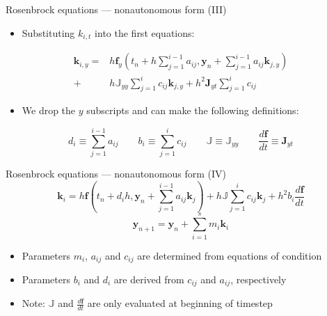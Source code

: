 \documentclass[serif]{beamer}
\begin{document}
\begin{frame}{Rosenbrock equations --- nonautonomous form (III)}
  \label{slide:nonautonomous}
  \begin{itemize}
  \item<1-> Substituting $k_{i,t}$ into the first equations:
  \end{itemize}
  \begin{align*}
    \mathbf{k}_{i,y} = &  h\mathbf{f}_y \left(t_n + h\sum_{j=1}^{i-1}a_{ij},\mathbf{y}_n + \sum_{j=1}^{i-1}a_{ij}\mathbf{k}_{j,y}\right) \\
                                + & h\mathbb{J}_{yy}\sum_{j=1}^i c_{ij}\mathbf{k}_{j,y}  + h^2\mathbf{J}_{yt}\sum_{j=1}^i c_{ij}
  \end{align*}
  \begin{itemize}
  \item We drop the $y$ subscripts and can make the following definitions: 
  \end{itemize}
  \begin{equation}
    \nonumber d_i \equiv \sum_{j=1}^{i-1} a_{ij} \qquad  b_i \equiv \sum_{j=1}^i c_{ij} \qquad \mathbb{J} \equiv \mathbb{J}_{yy} \qquad \frac{d\mathbf{f}}{dt} \equiv \mathbf{J}_{yt}
  \end{equation}
\end{frame}

\begin{frame}{Rosenbrock equations --- nonautonomous form (IV)}
  \begin{equation}
    \nonumber \mathbf{k}_{i} = h\mathbf{f} \left(t_n + d_ih,\mathbf{y}_n + \sum_{j=1}^{i-1}a_{ij}\mathbf{k}_{j}\right) 
                                + h\mathbb{J}\sum_{j=1}^i c_{ij}\mathbf{k}_{j}  + h^2b_i\frac{d\mathbf{f}}{dt}
  \end{equation}
  \begin{equation}
    \nonumber \mathbf{y}_{n+1} = \mathbf{y}_{n} + \sum_{i=1}^s m_i\mathbf{k}_i
  \end{equation}
  \vfill
  \begin{itemize}
  \item<1-> Parameters $m_i$, $a_{ij}$ and $c_{ij}$ are determined from equations of condition
  \item<1-> Parameters $b_i$ and $d_i$ are derived from $c_{ij}$ and $a_{ij}$, respectively
  \item<1-> \alert{Note:} $\mathbb{J}$ and $\frac{d\mathbf{f}}{dt}$ are only evaluated at beginning of timestep
  \end{itemize}
\end{frame}
\end{document}
